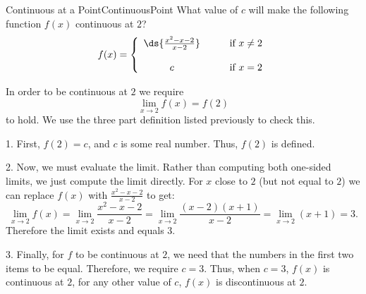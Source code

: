 \begin{example}{Continuous at a Point}{ContinuousPoint}
	What value of $c$ will make the following function $f(x)$ continuous at $2$?
	$$f(x)=\left\{\begin{array}{cl}
	\ds{\frac{x^2-x-2}{x-2}}&\qquad\mbox{if $x\neq 2$}\\
	\\
	c&\qquad\mbox{if $x=2$}\\\end{array}\right.$$
\end{example}
\begin{solution} 
	In order to be continuous at $2$ we require 
	$$\lim_{x\to 2}f(x)=f(2)$$
	to hold.
	We use the three part definition listed previously to check this.
	
	1. First, $f(2)=c$, and $c$ is some real number. Thus, $f(2)$ is defined.
	
	2. Now, we must evaluate the limit. 
	Rather than computing both one-sided limits, we just compute the limit directly.
	For $x$ close to $2$ (but not equal to $2$) we can replace $f(x)$ with $\frac{x^2-x-2}{x-2}$ to get:
	$$\lim_{x\to 2}f(x)=\lim_{x\to 2}\frac{x^2-x-2}{x-2}=\lim_{x\to 2}\frac{(x-2)(x+1)}{x-2}=\lim_{x\to 2}(x+1)=3.$$
	Therefore the limit exists and equals $3$.
	
	3. Finally, for $f$ to be continuous at $2$, we need that the numbers in the first two items to be equal.
	Therefore, we require $c=3$.
	Thus, when $c=3$, $f(x)$ is continuous at $2$, for any other value of $c$, $f(x)$ is discontinuous at $2$.
\end{solution}


